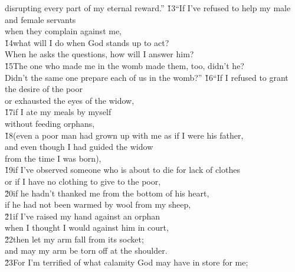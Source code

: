 \begin{poetry}
\poemll    disrupting every part of my eternal reward.''
\poeml \v{13}``If I've refused to help my male and female servants \\
\poemll    when they complain against me, \\
\poeml \v{14}what will I do when God stands up to act? \\
\poemll    When he asks the questions, how will I answer him? \\
\poeml \v{15}The one who made me in the womb made them, too, didn't he? \\
\poemll    Didn't the same one prepare each of us in the womb?''
\poeml \v{16}``If I refused to grant the desire of the poor \\
\poemll    or exhausted the eyes of the widow, \\
\poeml \v{17}if I ate my meals by myself \\
\poemll    without feeding orphans, \\
\poeml \v{18}(even a poor man had grown up with me as if I were his father, \\
\poemll    and even though I had guided the widow \\
\poemlll       from the time I was born), \\
\poeml \v{19}if I've observed someone who is about to die for lack of clothes \\
\poemll    or if I have no clothing to give to the poor, \\
\poeml \v{20}if he hadn't thanked me from the bottom of his heart, \\
\poemll    if he had not been warmed by wool from my sheep, \\
\poeml \v{21}if I've raised my hand against an orphan \\
\poemll    when I thought I would against him in court, \\
\poeml \v{22}then let my arm fall from its socket; \\
\poemll    and may my arm be torn off at the shoulder. \\
\poeml \v{23}For I'm terrified of what calamity God may have in store for me; \\

\end{poetry}
